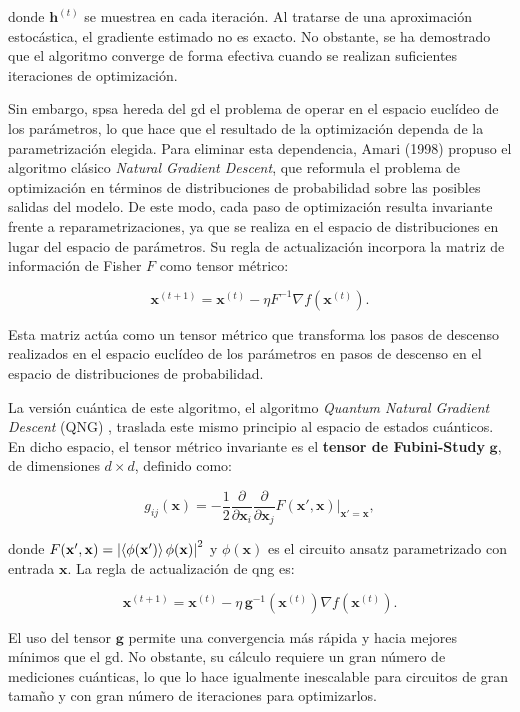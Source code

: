 donde $\mathbf{h}^{(t)}$ se muestrea en cada iteración. Al tratarse de una aproximación estocástica, el gradiente estimado no es exacto. No obstante, se ha demostrado que el algoritmo converge de forma efectiva cuando se realizan suficientes iteraciones de optimización.

Sin embargo, \gls{spsa} hereda del \gls{gd} el problema de operar en el espacio euclídeo de los parámetros, lo que hace que el resultado de la optimización dependa de la parametrización elegida. Para eliminar esta dependencia, Amari (1998) propuso el algoritmo clásico \textit{Natural Gradient Descent}, que reformula el problema de optimización en términos de distribuciones de probabilidad sobre las posibles salidas del modelo. De este modo, cada paso de optimización resulta invariante frente a reparametrizaciones, ya que se realiza en el espacio de distribuciones en lugar del espacio de parámetros. Su regla de actualización incorpora la matriz de información de Fisher $F$ como tensor métrico:

\[
  \mathbf{x}^{(t+1)} = \mathbf{x}^{(t)} - \eta F^{-1} \nabla f(\mathbf{x}^{(t)}).
\]

Esta matriz actúa como un tensor métrico que transforma los pasos de descenso realizados en el espacio euclídeo de los parámetros en pasos de descenso en el espacio de distribuciones de probabilidad.

La versión cuántica de este algoritmo, el algoritmo \textit{Quantum Natural Gradient Descent} (QNG) \cite{stokes_qng_2020}, traslada este mismo principio al espacio de estados cuánticos. En dicho espacio, el tensor métrico invariante es el \textbf{tensor de Fubini-Study} $\mathbf{g}$, de dimensiones $d \times d$, definido como:

\[
  g_{ij}(\mathbf{x}) = -\frac{1}{2} \frac{\partial}{\partial \mathbf{x}_i} \frac{\partial}{\partial \mathbf{x}_j} F(\mathbf{x}', \mathbf{x}) \bigg|_{\mathbf{x}'=\mathbf{x}},
\]

donde $F(\mathbf{x}', \mathbf{x}) = \left| \braket{\phi(\mathbf{x}')}{\phi(\mathbf{x})} \right|^2$ y $\phi(\mathbf{x})$ es el circuito ansatz parametrizado con entrada $\mathbf{x}$. La regla de actualización de \gls{qng} es:

\[
  \mathbf{x}^{(t+1)} = \mathbf{x}^{(t)} - \eta\, \mathbf{g}^{-1}(\mathbf{x}^{(t)}) \nabla f(\mathbf{x}^{(t)}).
\]

El uso del tensor $\mathbf{g}$ permite una convergencia más rápida y hacia mejores mínimos que el \gls{gd}. No obstante, su cálculo requiere un gran número de mediciones cuánticas, lo que lo hace igualmente inescalable para circuitos de gran tamaño y con gran número de iteraciones para optimizarlos.

